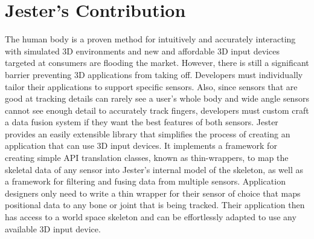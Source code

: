\section{Jester's Contribution}

The human body is a proven method for intuitively and accurately interacting with simulated 3D environments and new and affordable 3D input devices targeted at consumers are flooding the market. However, there is still a significant barrier preventing 3D applications from taking off. Developers must individually tailor their applications to support specific sensors. Also, since sensors that are good at tracking details can rarely see a user's whole body and wide angle sensors cannot see enough detail to accurately track fingers, developers must custom craft a data fusion system if they want the best features of both sensors. Jester provides an easily extensible library that simplifies the process of creating an application that can use 3D input devices. It implements a framework for creating simple API translation classes, known as thin-wrappers, to map the skeletal data of any sensor into Jester’s internal model of the skeleton, as well as a framework for filtering and fusing data from multiple sensors. Application designers only need to write a thin wrapper for their sensor of choice that maps positional data to any bone or joint that is being tracked. Their application then has access to a world space skeleton and can be effortlessly adapted to use any available 3D input device.